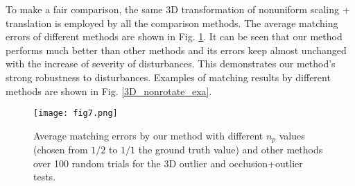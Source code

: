 \documentclass[11pt,bezier,]{article}
\begin{document}
To make a fair comparison,
the same 3D transformation of nonuniform scaling + translation is employed by all the comparison methods.
The average matching errors of different methods are shown in Fig. \ref{3D_nonrotate_sta}.
It can be seen that our method performs much better than other methods
and its errors keep almost unchanged with the increase of severity  of disturbances.
This demonstrates our method's strong robustness to disturbances.
Examples of matching results by different methods are shown in Fig. \ref{3D_nonrotate_exa}.


\begin{figure}[ht]
\centering

\texttt{[image: fig7.png]}


% 
% 
    
\caption{Average  matching errors by our method with
different $n_p$ values (chosen from $1/2$ to $1/1$ the ground truth value)
and other  methods over 100 random trials
for the 3D outlier and occlusion+outlier tests.
\label{3D_nonrotate_sta}}
\end{figure}    
    
\end{document}

